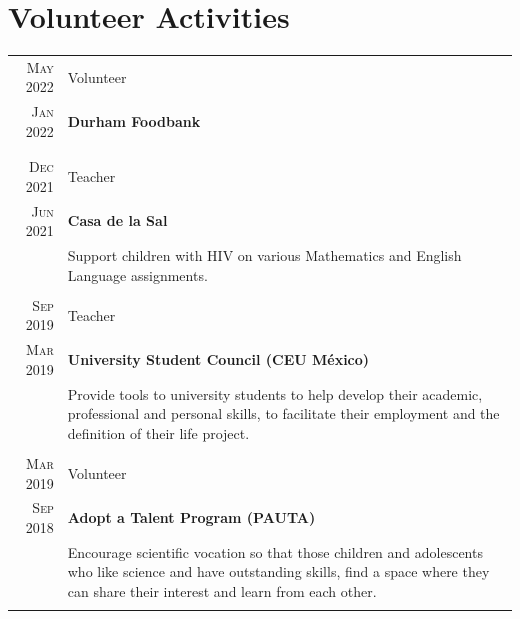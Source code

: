 \documentclass[a4paper,10pt]{article} %
\begin{document}
\section{Volunteer Activities}
\bigskip
\begin{tabular}{r|p{11cm}}

	\textsc{May 2022} & Volunteer\\
	\textsc{Jan 2022} &\footnotesize{\textbf{Durham Foodbank}}\\
	&\footnotesize{}\\
	\multicolumn{2}{c}{} \\	


	\textsc{Dec 2021} & Teacher\\
	\textsc{Jun 2021} &\footnotesize{\textbf{Casa de la Sal}}\\
	&\footnotesize{Support children with HIV on various Mathematics and English Language assignments.}\\
	\multicolumn{2}{c}{} \\	

	
	\textsc{Sep 2019} & Teacher\\
	\textsc{Mar 2019} &\footnotesize{\textbf{University Student Council (CEU México)}}\\
	&\footnotesize{Provide tools to university students to help develop their academic, professional and personal skills, to facilitate their employment and the definition of their life project.}\\
	\multicolumn{2}{c}{} \\	
	

	\textsc{Mar 2019} & Volunteer\\
	\textsc{Sep 2018} &\footnotesize{\textbf{Adopt a Talent Program (PAUTA)}}\\
	&\footnotesize{Encourage scientific vocation so that those children and adolescents who like science and have outstanding skills, find a space where they can share their interest and learn from each other.}\\
	\multicolumn{2}{c}{} \\	
	

\end{tabular}
\end{document}
